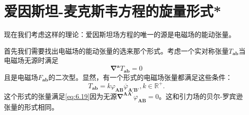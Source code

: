 \section{爱因斯坦-麦克斯韦方程的旋量形式*}

现在我们考虑这样的理论：爱因斯坦场方程的唯一的源是电磁场的能动张量。



首先我们需要找出电磁场的能动张量的选来那个形式。考虑一个实对称张量$T_{\boldsymbol{ab}}$当电磁场无源时满足
\begin{equation}
	\boldsymbol{\nabla }^{\boldsymbol{a}} T_{\boldsymbol{ab}} =0
	\label{eq:6.19}
\end{equation}
且是电磁场$F_{\boldsymbol{ab}}$的二次型。显然，有一个形式的电磁场张量都满足这些条件：
\begin{equation*}
	T_{\boldsymbol{ab}} =k\varphi _{\boldsymbol{AB}}\overline{\varphi }_{\boldsymbol{A} '\boldsymbol{B} '} ,k\in \mathbb{R}^{+} .
\end{equation*}
这个形式的张量满足\ref{eq:6.19}因为无源$\boldsymbol{\nabla }^{\boldsymbol{AA} '} \varphi _{\boldsymbol{AB}} =0$。这和引力场的贝尔-罗宾逊张量的形式相同。



